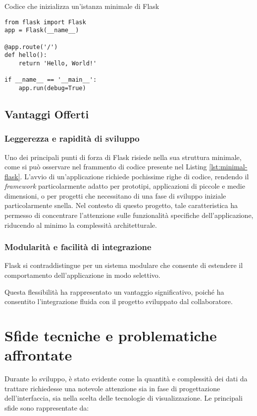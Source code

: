 \begin{listing}[H]
\caption{Codice che inizializza un'istanza minimale di Flask}
\label{lst:minimal-flask} %
\begin{verbatim}
from flask import Flask
app = Flask(__name__)

@app.route('/')
def hello():
    return 'Hello, World!'

if __name__ == '__main__':
    app.run(debug=True)
\end{verbatim}
\end{listing}

\subsection{Vantaggi Offerti}
\subsubsection*{Leggerezza e rapidità di sviluppo}
Uno dei principali punti di forza di Flask risiede nella sua struttura minimale, come si può osservare nel frammento di codice presente nel Listing \ref{lst:minimal-flask}. L'avvio di un'applicazione richiede pochissime righe di codice, rendendo il \textit{framework} particolarmente adatto per prototipi, applicazioni di piccole e medie dimensioni, o per progetti che necessitano di una fase di sviluppo iniziale particolarmente snella.  
Nel contesto di questo progetto, tale caratteristica ha permesso di concentrare l'attenzione sulle funzionalità specifiche dell'applicazione, riducendo al minimo la complessità architetturale.

\subsubsection*{Modularità e facilità di integrazione}
Flask si contraddistingue per un sistema modulare che consente di estendere il comportamento dell'applicazione in modo selettivo. \cite{flask-docs}

Questa flessibilità ha rappresentato un vantaggio significativo, poiché ha consentito l'integrazione fluida con il progetto sviluppato dal collaboratore.

\section{Sfide tecniche e problematiche affrontate}

Durante lo sviluppo, è stato evidente come la quantità e complessità dei dati da trattare richiedesse una notevole attenzione sia in fase di progettazione dell'interfaccia, sia nella scelta delle tecnologie di visualizzazione. Le principali sfide sono rappresentate da:

